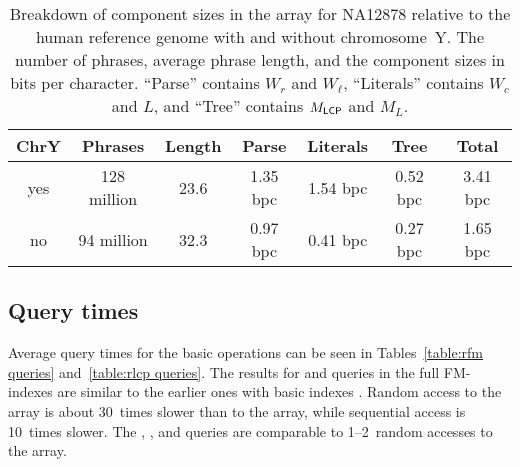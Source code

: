 \begin{table*}
\caption{Breakdown of component sizes in the \RLCP{} array for NA12878 relative
to the human reference genome with and without chromosome~Y. The number of phrases,
average phrase length, and the component sizes in bits per character. ``Parse''
contains $W_{r}$ and $W_{\ell}$, ``Literals'' contains $W_{c}$ and $L$, and ``Tree''
contains $M_{\mathsf{LCP}}$ and $M_{L}$.}\label{table:rlcp components}
\setlength{\extrarowheight}{2pt}
\setlength{\tabcolsep}{3pt}
\begin{center}
\begin{tabular}{c|cc|ccc|c}
\hline
\textbf{ChrY} & \textbf{Phrases} & \textbf{Length} & \textbf{Parse} & \textbf{Literals} & \textbf{Tree} & \textbf{Total} \\
\hline
yes           &      128 million &            23.6 &      1.35 bpc &          1.54 bpc &      0.52 bpc &        3.41 bpc \\
no            &       94 million &            32.3 &      0.97 bpc &          0.41 bpc &      0.27 bpc &        1.65 bpc \\
\hline
\end{tabular}
\end{center}
\end{table*}

\subsection{Query times}

Average query times for the basic operations can be seen in Tables~\ref{table:rfm
queries} and~\ref{table:rlcp queries}. The results for \LF{} and \Psiop{} queries
in the full FM-indexes are similar to the earlier ones with basic indexes
\cite{Boucher2015}. Random access to the \RLCP{} array is about 30~times
slower than to the \LCP{} array, while sequential access is 10~times slower.
The \nsv, \psv, and \rmq{} queries are comparable to 1\nobreakdash--2~random
accesses to the \RLCP{} array.

